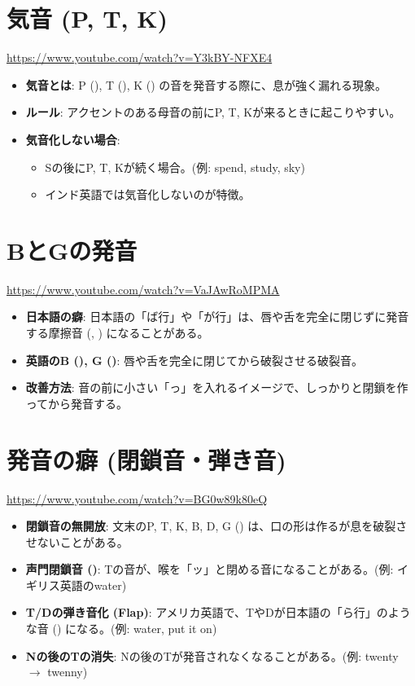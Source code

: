 \documentclass{jlreq}
\begin{document}
\section{気音 (P, T, K)}
\href{https://www.youtube.com/watch?v=Y3kBY-NFXE4}{https://www.youtube.com/watch?v=Y3kBY-NFXE4}
\begin{itemize}
    \item \textbf{気音とは}: P (\textipa{[p\textsuperscript{h}]}), T (\textipa{[t\textsuperscript{h}]}), K (\textipa{[k\textsuperscript{h}]}) の音を発音する際に、息が強く漏れる現象。
    \item \textbf{ルール}: アクセントのある母音の前にP, T, Kが来るときに起こりやすい。
    \item \textbf{気音化しない場合}:
    \begin{itemize}
        \item Sの後にP, T, Kが続く場合。(例: spend, study, sky)
        \item インド英語では気音化しないのが特徴。
    \end{itemize}
\end{itemize}

\section{BとGの発音}
\href{https://www.youtube.com/watch?v=VaJAwRoMPMA}{https://www.youtube.com/watch?v=VaJAwRoMPMA}
\begin{itemize}
    \item \textbf{日本語の癖}: 日本語の「ば行」や「が行」は、唇や舌を完全に閉じずに発音する摩擦音 (\textipa{[\textbeta]}, \textipa{[\textgamma]}) になることがある。
    \item \textbf{英語のB (\textipa{[b]}), G (\textipa{[g]})}: 唇や舌を完全に閉じてから破裂させる破裂音。
    \item \textbf{改善方法}: 音の前に小さい「っ」を入れるイメージで、しっかりと閉鎖を作ってから発音する。
\end{itemize}

\section{発音の癖 (閉鎖音・弾き音)}
\href{https://www.youtube.com/watch?v=BG0w89k80eQ}{https://www.youtube.com/watch?v=BG0w89k80eQ}
\begin{itemize}
    \item \textbf{閉鎖音の無開放}: 文末のP, T, K, B, D, G () は、口の形は作るが息を破裂させないことがある。
    \item \textbf{声門閉鎖音 (\textipa{[\textglotstop]})}: Tの音が、喉を「ッ」と閉める音になることがある。(例: イギリス英語のwater)
    \item \textbf{T/Dの弾き音化 (Flap)}: アメリカ英語で、TやDが日本語の「ら行」のような音 (\textipa{[]}) になる。(例: water, put it on)
    \item \textbf{Nの後のTの消失}: Nの後のTが発音されなくなることがある。(例: twenty $\to$ twenny)
\end{itemize}
\end{document}
